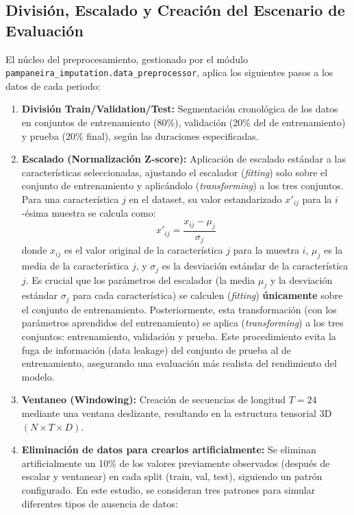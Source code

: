 \subsection{División, Escalado y Creación del Escenario de Evaluación}
\label{subsec:split_scale_eval_setup}
El núcleo del preprocesamiento, gestionado por el módulo \\ \texttt{pampaneira\_imputation.data\_preprocessor}, aplica los siguientes pasos a los datos de cada periodo:
\begin{enumerate}
    \item \textbf{División Train/Validation/Test:} Segmentación cronológica de los datos en conjuntos de entrenamiento (80\%), validación (20\% del de entrenamiento) y prueba (20\% final), según las duraciones especificadas.
    \item \textbf{Escalado (Normalización Z-score):} Aplicación de escalado estándar a las características seleccionadas, ajustando el escalador (\textit{fitting}) solo sobre el conjunto de entrenamiento y aplicándolo (\textit{transforming}) a los tres conjuntos.
    Para una característica $j$ en el dataset, su valor estandarizado $x'_{ij}$ para la $i$-ésima muestra se calcula como:
    \begin{equation}
    x'_{ij} = \frac{x_{ij} - \mu_j}{\sigma_j}
    \label{eq:zscore}
    \end{equation}
    donde $x_{ij}$ es el valor original de la característica $j$ para la muestra $i$, $\mu_j$ es la media de la característica $j$, y $\sigma_j$ es la desviación estándar de la característica $j$.
    Es crucial que los parámetros del escalador (la media $\mu_j$ y la desviación estándar $\sigma_j$ para cada característica) se calculen (\textit{fitting}) \textbf{únicamente} sobre el conjunto de entrenamiento. Posteriormente, esta transformación (con los parámetros aprendidos del entrenamiento) se aplica (\textit{transforming}) a los tres conjuntos: entrenamiento, validación y prueba. Este procedimiento evita la fuga de información (data leakage) del conjunto de prueba al de entrenamiento, asegurando una evaluación más realista del rendimiento del modelo.
    \item \textbf{Ventaneo (Windowing):} Creación de secuencias de longitud $T=24$ mediante una ventana deslizante, resultando en la estructura tensorial 3D $(N \times T \times D)$.
    \item \textbf{Eliminación de datos para crearlos artificialmente:} Se eliminan artificialmente un 10\% de los valores previamente observados (después de escalar y ventanear) en cada split (train, val, test), siguiendo un patrón configurado. En este estudio, se consideran tres patrones para simular diferentes tipos de ausencia de datos:

\end{enumerate}
